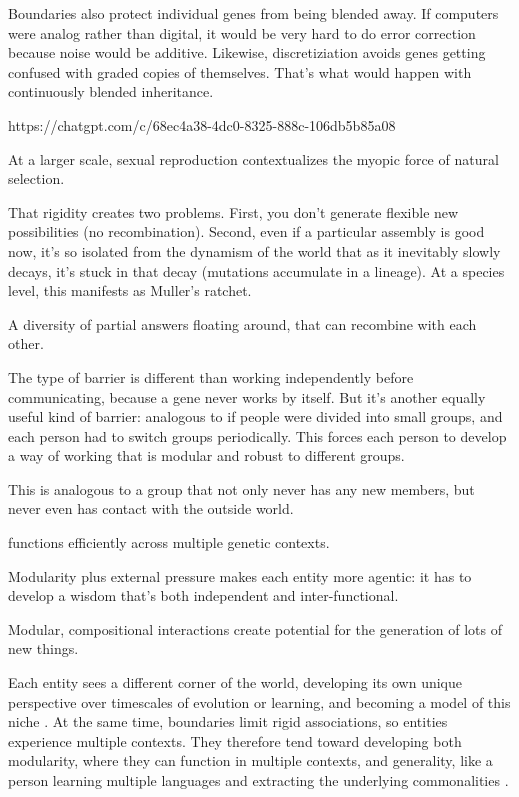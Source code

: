 Boundaries also protect individual genes from being blended away. If computers were analog rather than digital, it would be very hard to do error correction because noise would be additive. Likewise, discretiziation avoids genes getting confused with graded copies of themselves. That's what would happen with continuously blended inheritance.  

https://chatgpt.com/c/68ec4a38-4dc0-8325-888c-106db5b85a08

At a larger scale, sexual reproduction contextualizes the myopic force of natural selection.

That rigidity creates two problems. First, you don't generate flexible new possibilities (no recombination). Second, even if a particular assembly is good now, it's so isolated from the dynamism of the world that as it inevitably slowly decays, it's stuck in that decay (mutations accumulate in a lineage). At a species level, this manifests as Muller's ratchet.

A diversity of partial answers floating around, that can recombine with each other.


The type of barrier is different than working independently before communicating, because a gene never works by itself. But it's another equally useful kind of barrier: analogous to if people were divided into small groups, and each person had to switch groups periodically. This forces each person to develop a way of working that is modular and robust to different groups. 


This is analogous to a group that not only never has any new members, but never even has contact with the outside world. 

functions efficiently across multiple genetic contexts. 

Modularity plus external pressure makes each entity more agentic: it has to develop a wisdom that's both independent and inter-functional.

Modular, compositional interactions create potential for the generation of lots of new things.

Each entity sees a different corner of the world, developing its own unique perspective over timescales of evolution or learning, and becoming a model of this niche \citep{conant1970every, friston2013life}. At the same time, boundaries limit rigid associations, so entities experience multiple contexts. They therefore tend toward developing both modularity, where they can function in multiple contexts, and generality, like a person learning multiple languages and extracting the underlying commonalities \citep{clune2013evolutionary,melo2016modularity, simon2018near}. 

